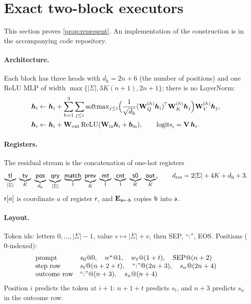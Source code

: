 \section{Exact two-block executors}
\label{app:architectures}

This section proves \cref{prop:represent}. An implementation of the construction is in the accompanying code repository.

\paragraph{Architecture.}
\label{app:construction}
\label{app:model}
Each block has three heads with $d_{\mathrm h}=2n+6$ (the number of positions) and one ReLU MLP of width $\max\{|\Sigma|,3K(n+1),2n+1\}$;
there is no LayerNorm:
\begin{align*}
 \bm h_i&\leftarrow \bm h_i+\sum_{h=1}^{3}\sum_{j\le i}\operatorname{softmax}_{j\le i}\Bigl(\tfrac{1}{\sqrt{d_{\mathrm h}}}(\mathbf W^{(h)}_Q\bm h_i)^{\!\top}\mathbf W^{(h)}_K\bm h_j\Bigr)\mathbf W^{(h)}_V\bm h_j,\\
 \bm h_i&\leftarrow \bm h_i+\mathbf W_{\mathrm{out}}\relu(\mathbf W_{\mathrm{in}}\bm h_i+\bm b_{\mathrm{in}}),\qquad \mathrm{logits}_i=\mathbf V\,\bm h_i .
\end{align*}

\paragraph{Registers.} The residual stream is the concatenation of one-hot registers
\[
 \underbrace{\reg{tl}}_{|\Sigma|}\ \underbrace{\reg{tv}}_{K}\ \underbrace{\reg{pos}}_{d_{\mathrm h}}\ \underbrace{\reg{qry}}_{|\Sigma|}\ \underbrace{\reg{match}}_{1}\
 \underbrace{\reg{prev}}_{K}\ \underbrace{\reg{mt}}_{1}\ \underbrace{\reg{cnt}}_{1}\ \underbrace{\reg{s0}}_{K}\ \underbrace{\reg{out}}_{K},
 \qquad d_{\mathrm{res}}=2|\Sigma|+4K+d_{\mathrm h}+3 .
\]
$\mathsf{r}[a]$ is coordinate $a$ of register $\mathsf{r}$, and $\mathbf E_{\mathsf{a}\leftarrow\mathsf{b}}$ copies $\mathsf{b}$ into $\mathsf{a}$.

\paragraph{Layout.} Token ids: letters $0,\ldots,|\Sigma|-1$, value $v\mapsto|\Sigma|+v$, then SEP, ``:'', EOS. Positions ($0$-indexed):
\[
\begin{array}{ll}
 \text{prompt} & s_0@0,\quad w^\star@1,\quad w_t@(1+t),\quad \mathrm{SEP}@(n+2)\\
 \text{step row} & s_t@(n+2+t),\quad ``{:}"@(2n+3),\quad s_n@(2n+4)\\
 \text{outcome row} & ``{:}"@(n+3),\quad s_n@(n+4)
\end{array}
\]
Position $i$ predicts the token at $i+1$: $n+1+t$ predicts $s_t$, and $n+3$ predicts $s_n$ in the outcome row.

